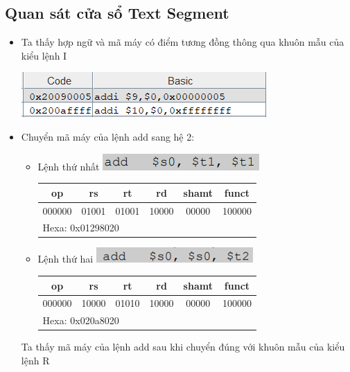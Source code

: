 \documentclass[12pt,a4paper,oneside]{article}
\begin{document}
	\subsection{Quan sát cửa sổ Text Segment}
		\begin{itemize}
		
			\item Ta thấy hợp ngữ và mã máy có điểm tương đồng thông qua khuôn mẫu của kiểu lệnh I
		\begin{center}
			\includegraphics[scale=1]{image/11}
		\end{center}
			\item Chuyển mã máy của lệnh add sang hệ 2:
			\begin{itemize}
				\item Lệnh thứ nhất \quad \quad \includegraphics[scale=1]{image/12}
				\begin{center}
	\begin{tabular}{|c|c|c|c|c|c|}
	\hline 
	op & rs & rt & rd & shamt & funct \\ 
	\hline 
	000000 & 01001 & 01001 & 10000 & 00000 & 100000 \\ 
	\hline 
	\multicolumn{6}{|l|}{Hexa: 0x01298020} \\ 
	\hline 
	\end{tabular} 
	\end{center}
		\item Lệnh thứ hai \quad \quad \includegraphics[scale=1]{image/13}
				\begin{center}
	\begin{tabular}{|c|c|c|c|c|c|}
	\hline 
	op & rs & rt & rd & shamt & funct \\ 
	\hline 
	000000 & 10000 & 01010 & 10000 & 00000 & 100000 \\ 
	\hline 
	\multicolumn{6}{|l|}{Hexa: 0x020a8020} \\ 
	\hline 
	\end{tabular} 
	\end{center}
\end{itemize}			 
Ta thấy mã máy của lệnh add sau khi chuyển đúng với khuôn mẫu của kiểu lệnh R
		\end{itemize}
		\pagebreak
\end{document}
